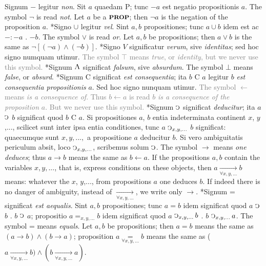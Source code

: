 \documentclass{book}
\newcommand{\C}{\mathop{\sbox0{$\displaystyle$$\reflectbox{C}$} %
\raisebox{-\height+\ht0-0.05cm}[\ht0][\dp0]{\scalebox{0.8}[0.8]{\copy0}}}\displaylimits} %
\newcommand{\abs}{\mathop{\rotatebox[origin=c]{180}{V}}}
\newcommand{\prop}{\mathord{\text{{\footnotesize \textbf{PROP}}}}}
\newcommand\irrelavent[1]{\textcolor{gray}{#1}}
\newenvironment{translateTwoCol}
               { %
                 \columnratio{0.5, 0.5}
                 \begin{paracol}{2}
                 \newcommand{\LAT}{\switchcolumn[0]*}
                 \newcommand{\ENG}{\switchcolumn[1]}
               }
               { %
                 \let\ENG\undefined
                 \let\LAT\undefined
                 \end{paracol}
               }
\begin{document}
\begin{translateTwoCol}
Signum $-$ legitur \emph{non}. Sit $a$ quaedam $\text{P}$; tunc $-a$ est negatio propositionis $a$.
\ENG The symbol $\neg$ is read \emph{not}. Let $a$ be a $\prop$; then $\neg a$ is the negation of the proposition $a$.
\LAT Signo $\cup$ legitur \emph{vel}. Sint $a,b$ propositiones; tunc $a \cup b$ idem est ac $-:-a$ $.$ $-b$.
\ENG The symbol $\vee$ is read \emph{or}. Let $a,b$ be propositions; then $a \vee b$ is the same as $\neg[(\neg a) \wedge (\neg b)]$.
\LAT \text{[}Signo $V$ significatur \emph{verum}, sive \emph{identitas}; sed hoc signo numquam utimur\text{]}.  %
\ENG \irrelavent{The symbol $\top$  means \emph{true}, or \emph{identity}, but we never use this symbol.}
\LAT Signum  $\abs$ significat \emph{falsum}, sive \emph{absurdum}.
\ENG The symbol $\bot$ means \emph{false}, or \emph{absurd}.
\LAT \text{[}Signum C significat \emph{est consequentia}; ita $b$ C $a$ legitur $b$ \emph{est consequentia propositionis} $a$. Sed hoc signo nunquam utimur\text{]}.
\ENG \irrelavent{The symbol $\leftarrow$ means \emph{is a consequence of}. Thus $b \leftarrow a$ is read $b$ \emph{is a consequence of the proposition} $a$. But we never use this symbol.}
\LAT Signum $\C$ significat \emph{deducitur}; ita $a$ $\C$ $b$ significat quod $b$ C $a$. Si propositiones $a$, $b$ entia indeterminata continent $x$, $y$,..., scilicet sunt inter ipsa entia conditiones, tunc $a$ $\C_{x,y,...}$ $b$ significat: quaecumque sunt $x,y,...,$ a propositione $a$ deducitur $b$. Si vero ambiguitatis periculum absit, loco $\C_{x,y,...}$, scribemus solum $\C$.
\ENG The symbol $\rightarrow$ means \emph{one deduces}; thus $a \rightarrow b$ means the same as $b \leftarrow a$. If the propositions $a,b$ contain the variables $x,y,...$, that is, express conditions on these objects, then $a \xrightarrow[\forall x,y,...]{} b$ means: whatever the $x$, $y$,..., from propositions $a$ one deduces $b$. If indeed there is no danger of ambiguity, instead of $\xrightarrow[\forall x,y,...]{}$, we write only $\rightarrow$.
\LAT Signum = significat \emph{est aequalis}. Sint $a,b$ propositiones; tunc $a=b$ idem significat quod $a$ $\C$ $b$ $.$ $b$ $\C$ $a$; propositio $a=_{x,y,...} b$ idem significat quod $a$ $ \C_{x,y,...} b$ $.$ $b$ $\C_{x,y,...} a$.
\ENG The symbol = means \emph{equals}. Let $a,b$ be propositions; then $a=b$ means the same as $(a \rightarrow b) \wedge (b \rightarrow a)$; proposition $a\underset{\forall x,y,...}=b$ means the same as ($a \xrightarrow[\forall x,y,...]{} b) \wedge (b \xrightarrow[\forall x,y,...]{} a)$.
\end{translateTwoCol}
\end{document}
